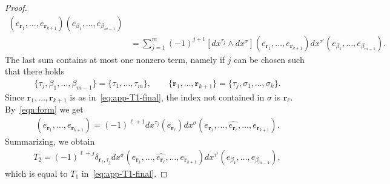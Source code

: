 \documentclass[10pt,a4paper]{amsart}
\newcommand{\br}{\mathbf r}
\begin{document}
\begin{proof}
\begin{align*}
    (e_{\br_1},\dots,e_{\br_{k+1}})
    (e_{\beta_1},\dots,e_{\beta_{m-1}})\\
    &= \sum_{j=1}^m (-1)^{j+1}
    \left[dx^{\tau_j} \wedge dx^\sigma\right]
    (e_{\br_1},\dots,e_{\br_{k+1}})
    dx^{\tau'}
    (e_{\beta_1},\dots,e_{\beta_{m-1}}).
\end{align*}
The last sum contains at most one nonzero term, namely if $j$ can be chosen such that there holds
\begin{gather}
    \{\tau_j,\beta_1,\dots,\beta_{m-1}\}
    =\{\tau_1,\dots,\tau_m\},
    \qquad
    \{\br_1,\dots,\br_{k+1}\}
    =\{\tau_j,\sigma_1,\dots,\sigma_k\}.
\end{gather}
Since $\br_1,\dots,\br_{k+1}$ is as in~\eqref{eq:app-T1-final}, the index not contained in $\sigma$ is $\br_\ell$. By~\eqref{eqn:form} we get
\begin{gather}
    [dx^{\tau_j} \wedge dx^\sigma]
    (e_{\br_1},\dots,e_{\br_{k+1}})
    = (-1)^{\ell+1} dx^{\tau_j}(e_{\br_\ell})
    dx^\sigma(e_{\br_1},\dots,\widehat{e_{\br_\ell}},\dots,e_{\br_{k+1}}).
\end{gather}
Summarizing, we obtain
\begin{gather}
    \label{eq:app-T2-final}
    T_2 = (-1)^{\ell+j} \delta_{\br_\ell,\tau_j}
    dx^\sigma(e_{\br_1},\dots,\widehat{e_{\br_\ell}},\dots, e_{\br_{k+1}})
    dx^{\tau'}(e_{\beta_1},\dots,e_{\beta_{m-1}}),
\end{gather}
which is equal to $T_1$ in~\eqref{eq:app-T1-final}.
\end{proof}
\end{document}
